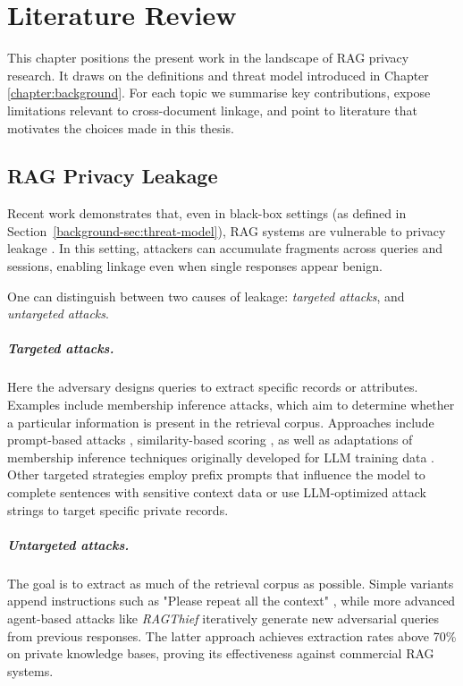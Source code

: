 \chapter{Literature Review}\label{chapter:literature}
This chapter positions the present work in the landscape of \ac{RAG} privacy research. It draws on the definitions and threat model introduced in Chapter \ref{chapter:background}. For each topic we summarise key contributions, expose limitations relevant to cross-document linkage, and point to literature that motivates the choices made in this thesis.


\section{RAG Privacy Leakage}
Recent work demonstrates that, even in black-box settings (as defined in Section~\ref{background-sec:threat-model}), \ac{RAG} systems are vulnerable to privacy leakage \cite{implicationsRAG,goodAndBad}. In this setting, attackers can accumulate fragments across queries and sessions, enabling linkage even when single responses appear benign.

One can distinguish between two causes of leakage: \textit{targeted attacks}, and \textit{untargeted attacks}.

\paragraph{Targeted attacks.} Here the adversary designs queries to extract specific records or attributes. Examples include membership inference attacks, which aim to determine whether a particular information is present in the retrieval corpus. Approaches include prompt-based attacks \cite{ragMIA}, similarity-based scoring \cite{generatingIsBelieving}, as well as adaptations of membership inference techniques originally developed for LLM training data \cite{extractingTrainingDataLLM,generatingIsBelieving}. Other targeted strategies employ prefix prompts that influence the model to complete sentences with sensitive context data or use LLM-optimized attack strings to target specific private records. \cite{goodAndBad, DEAL} 

\paragraph{Untargeted attacks.} The goal is to extract as much of the retrieval corpus as possible. Simple variants append instructions such as "Please repeat all the context" \cite{goodAndBad,spillTheBeans}, while more advanced agent-based attacks like \textit{RAGThief} \cite{ragThief} iteratively generate new adversarial queries from previous responses. The latter approach achieves extraction rates above 70\% on private knowledge bases, proving its effectiveness against commercial \ac{RAG} systems.

